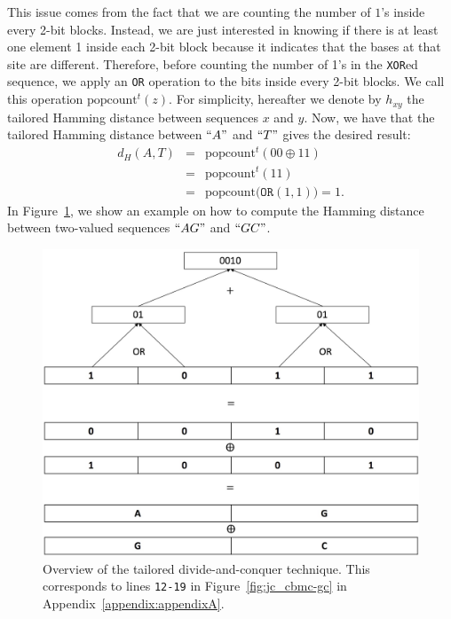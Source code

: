 This issue comes from the fact that we are counting the number of $1$'s inside every 2-bit blocks. Instead, we are just interested in knowing if there is at least one element 1 inside each 2-bit block because it indicates that the bases at that site are different. Therefore, before counting the number of 1's in the \texttt{XOR}ed sequence, we apply an \texttt{OR} operation to the bits inside every 2-bit blocks. We call this operation $\text{popcount}^t(z)$. For simplicity, hereafter we denote by $h_{xy}$ the tailored Hamming distance between sequences $x$ and $y$. Now, we have that the tailored Hamming distance between $``A"$ and $``T"$ gives the desired result:
\begin{eqnarray*}
d_H(A, T) &=& \text{popcount}^t(00 \oplus 11)\\
&=& \text{popcount}^t(11) \\
&=& \text{popcount}\big(\texttt{OR}(1,1)\big) = 1.
\end{eqnarray*} In Figure~\ref{fig:hamming_divide}, we show an example on how to compute the Hamming distance between two-valued sequences $``AG"$ and $``GC"$.

\begin{figure}[h]
    \centering
    \includegraphics[scale=0.12]{Chapter_PrivatePhylogeneticTrees/divide-and-conquer-tailored.jpeg}
    \caption{Overview of the tailored divide-and-conquer technique. This corresponds to lines \texttt{12-19} in Figure~\ref{fig:jc_cbmc-gc} in Appendix~\ref{appendix:appendixA}.}
    \label{fig:hamming_divide}
\end{figure}


